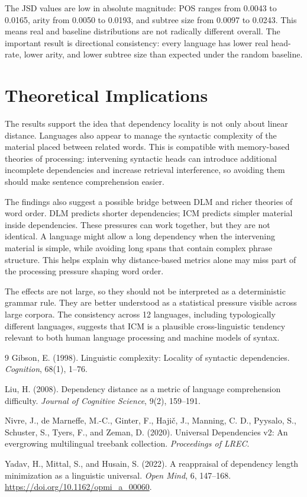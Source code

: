 \documentclass[11pt]{article}
\begin{document}
The JSD values are low in absolute magnitude: POS ranges from 0.0043 to 0.0165, arity from 0.0050 to 0.0193, and subtree size from 0.0097 to 0.0243. This means real and baseline distributions are not radically different overall. The important result is directional consistency: every language has lower real head-rate, lower arity, and lower subtree size than expected under the random baseline.

\section{Theoretical Implications}
The results support the idea that dependency locality is not only about linear distance. Languages also appear to manage the syntactic complexity of the material placed between related words. This is compatible with memory-based theories of processing: intervening syntactic heads can introduce additional incomplete dependencies and increase retrieval interference, so avoiding them should make sentence comprehension easier.

The findings also suggest a possible bridge between DLM and richer theories of word order. DLM predicts shorter dependencies; ICM predicts simpler material inside dependencies. These pressures can work together, but they are not identical. A language might allow a long dependency when the intervening material is simple, while avoiding long spans that contain complex phrase structure. This helps explain why distance-based metrics alone may miss part of the processing pressure shaping word order.

The effects are not large, so they should not be interpreted as a deterministic grammar rule. They are better understood as a statistical pressure visible across large corpora. The consistency across 12 languages, including typologically different languages, suggests that ICM is a plausible cross-linguistic tendency relevant to both human language processing and machine models of syntax.

\clearpage

\begin{thebibliography}{9}
Gibson, E. (1998).
\newblock Linguistic complexity: Locality of syntactic dependencies.
\newblock \emph{Cognition}, 68(1), 1--76.

Liu, H. (2008).
\newblock Dependency distance as a metric of language comprehension difficulty.
\newblock \emph{Journal of Cognitive Science}, 9(2), 159--191.

Nivre, J., de Marneffe, M.-C., Ginter, F., Haji\v{c}, J., Manning, C. D.,
Pyysalo, S., Schuster, S., Tyers, F., and Zeman, D. (2020).
\newblock Universal Dependencies v2: An evergrowing multilingual treebank collection.
\newblock \emph{Proceedings of LREC}.

Yadav, H., Mittal, S., and Husain, S. (2022).
\newblock A reappraisal of dependency length minimization as a linguistic universal.
\newblock \emph{Open Mind}, 6, 147--168.
\newblock \url{https://doi.org/10.1162/opmi_a_00060}.
\end{thebibliography}
\end{document}
